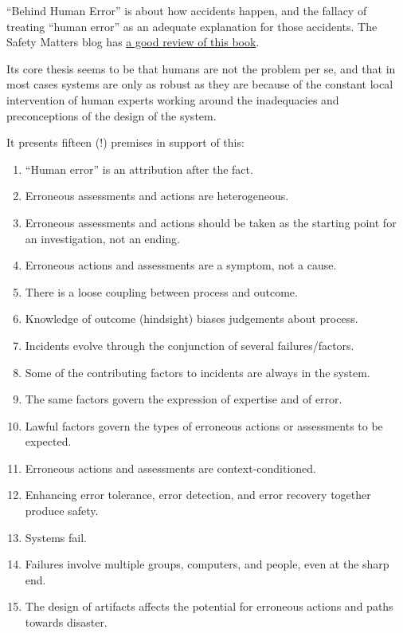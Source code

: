 ``Behind Human Error'' is about how accidents happen,
and the fallacy of treating ``human error'' as an adequate explanation for those accidents.
The Safety Matters blog has \href{http://www.safetymattersblog.com/2013/07/behind-human-error-by-woods-dekker-cook.html}{a good review of this book}.

Its core thesis seems to be that humans are not the problem per se,
and that in most cases systems are only as robust as they are because of the constant local intervention of human experts working around the inadequacies and preconceptions of the design of the system.

It presents fifteen (!) premises in support of this:

\begin{enumerate}
\item ``Human error'' is an attribution after the fact.
\item Erroneous assessments and actions are heterogeneous.
\item Erroneous assessments and actions should be taken as the starting point for an investigation, not an ending.
\item Erroneous actions and assessments are a symptom, not a cause.
\item There is a loose coupling between process and outcome.
\item Knowledge of outcome (hindsight) biases judgements about process.
\item Incidents evolve through the conjunction of several failures/factors.
\item Some of the contributing factors to incidents are always in the system.
\item The same factors govern the expression of expertise and of error.
\item Lawful factors govern the types of erroneous actions or assessments to be expected.
\item Erroneous actions and assessments are context-conditioned.
\item Enhancing error tolerance, error detection, and error recovery together produce safety.
\item Systems fail.
\item Failures involve multiple groups, computers, and people, even at the sharp end.
\item The design of artifacts affects the potential for erroneous actions and paths towards disaster.
\end{enumerate}

